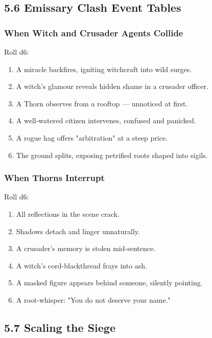 \documentclass[11pt]{book}
\begin{document}
\subsection{5.6 Emissary Clash Event Tables}

\subsubsection*{When Witch and Crusader Agents Collide}
Roll d6:

\begin{enumerate}[leftmargin=*]
    \item A miracle backfires, igniting witchcraft into wild surges.
    \item A witch's glamour reveals hidden shame in a crusader officer.
    \item A Thorn observes from a rooftop --- unnoticed at first.
    \item A well-watered citizen intervenes, confused and panicked.
    \item A rogue hag offers "arbitration" at a steep price.
    \item The ground splits, exposing petrified roots shaped into sigils.
\end{enumerate}

\subsubsection*{When Thorns Interrupt}
Roll d6:

\begin{enumerate}[leftmargin=*]
    \item All reflections in the scene crack.
    \item Shadows detach and linger unnaturally.
    \item A crusader's memory is stolen mid-sentence.
    \item A witch's cord-blackthread frays into ash.
    \item A masked figure appears behind someone, silently pointing.
    \item A root-whisper: "You do not deserve your name."
\end{enumerate}

\subsection{5.7 Scaling the Siege}
\end{document}
